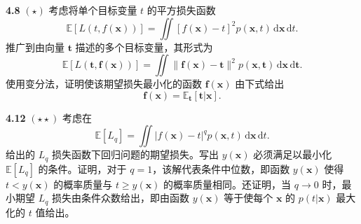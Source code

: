 \documentclass{article}
\begin{document}
\textbf{4.8} $(\star)$ 考虑将单个目标变量 $t$ 的平方损失函数
\begin{equation}
\mathbb{E}[L(t, f(\mathbf{x}))] = \iint [f(\mathbf{x}) - t]^2 p(\mathbf{x}, t) \,\mathrm{d}\mathbf{x}\,\mathrm{d}t. \tag{4.35}
\end{equation}
推广到由向量 $\mathbf{t}$ 描述的多个目标变量，其形式为
\begin{equation}
\mathbb{E}[L(\mathbf{t}, \mathbf{f}(\mathbf{x}))] = \iint \lVert\mathbf{f}(\mathbf{x}) - \mathbf{t}\rVert^2 p(\mathbf{x}, \mathbf{t}) \,\mathrm{d}\mathbf{x}\,\mathrm{d}\mathbf{t}. \tag{4.64}
\end{equation}
使用变分法，证明使该期望损失最小化的函数 $\mathbf{f}(\mathbf{x})$ 由下式给出
\begin{equation}
\mathbf{f}(\mathbf{x}) = \mathbb{E}_{\mathbf{t}}[\mathbf{t}|\mathbf{x}]. \tag{4.65}
\end{equation}


\textbf{4.12} $(\star\star)$ 考虑在
\begin{equation}
\mathbb{E}[L_q] = \iint \lvert f(\mathbf{x}) - t\rvert^q p(\mathbf{x}, t) \,\mathrm{d}\mathbf{x}\,\mathrm{d}t. \tag{4.40}
\end{equation}
给出的 $L_q$ 损失函数下回归问题的期望损失。写出 $y(\mathbf{x})$ 必须满足以最小化 $\mathbb{E}[L_q]$ 的条件。证明，对于 $q = 1$，该解代表条件中位数，即函数 $y(\mathbf{x})$ 使得 $t < y(\mathbf{x})$ 的概率质量与 $t \ge y(\mathbf{x})$ 的概率质量相同。还证明，当 $q \to 0$ 时，最小期望 $L_q$ 损失由条件众数给出，即由函数 $y(\mathbf{x})$ 等于使每个 $\mathbf{x}$ 的 $p(t|\mathbf{x})$ 最大化的 $t$ 值给出。
\end{document}
